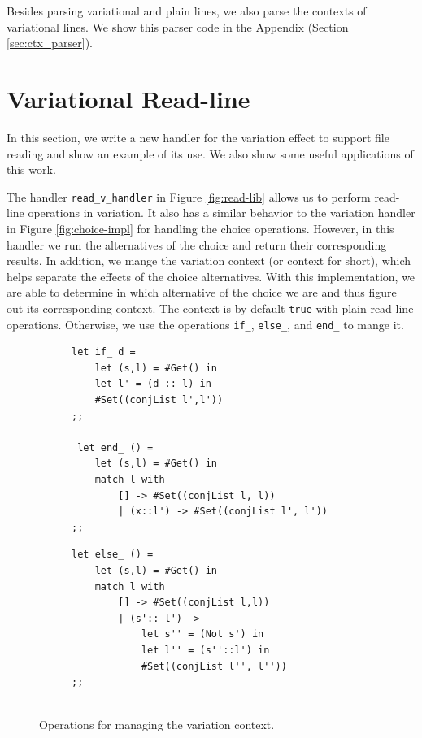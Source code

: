 Besides parsing variational and plain lines, we also parse the contexts of variational lines. We show this parser code in the Appendix (Section \ref{sec:ctx_parser}).


\section{Variational Read-line}
\label{sec:file_read}

In this section, we write a new handler for the variation effect to support file reading and show an example of its use. We also show some useful applications of this work.

The handler \texttt{read\_v\_handler} in Figure \ref{fig:read-lib} allows us to perform read-line operations in variation. It also has a similar behavior to the variation handler in Figure \ref{fig:choice-impl} for handling the choice operations. However, in this handler we run the alternatives of the choice and return their corresponding results. In addition, we mange the variation context (or context for short), which helps separate the effects of the choice alternatives. With this implementation, we are able to determine in which alternative of the choice we are and thus figure out its corresponding context. The context is by default \texttt{true} with plain read-line operations. Otherwise, we use the operations \texttt{if\_}, \texttt{else\_}, and \texttt{end\_} to mange it.

\begin{figure}
\begin{subfigure}[b]{.5\textwidth}
  \centering
 \begin{lstlisting}[]
let if_ d =
    let (s,l) = #Get() in 
    let l' = (d :: l) in
    #Set((conjList l',l'))  
;;    

 let end_ () = 
    let (s,l) = #Get() in 
    match l with
        [] -> #Set((conjList l, l))
        | (x::l') -> #Set((conjList l', l'))  
;; 

\end{lstlisting}
\end{subfigure} \hspace{1em}
\begin{subfigure}[b]{.5\textwidth}
  \centering
 \begin{lstlisting}[]
let else_ () =
    let (s,l) = #Get() in 
    match l with
        [] -> #Set((conjList l,l))
        | (s':: l') -> 
            let s'' = (Not s') in 
            let l'' = (s''::l') in
            #Set((conjList l'', l'')) 
;;
  		
\end{lstlisting}
\end{subfigure}
  \caption{Operations for managing the variation context.}
  \label{fig:c-form-impl}
\end{figure}



